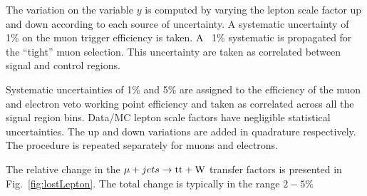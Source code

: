 The variation on the variable $y$ is computed by varying the lepton scale factor
up and down according to each source of uncertainty. 
A systematic uncertainty of 1\% on the muon trigger efficiency is taken. 
A ~1\% systematic is propagated for the ``tight'' muon selection. 
This uncertainty are taken as correlated between signal and control regions. 

Systematic uncertainties of 1\% and 5\% are assigned to the efficiency of the muon and electron veto working point efficiency and taken as correlated across all the signal region bins. 
Data/MC lepton scale factors have negligible statistical uncertainties. 
The up and down variations are added in quadrature respectively. 
The procedure is repeated separately for muons and
electrons. 

The relative change in the $\mu + jets \rightarrow \mathrm{tt+W}$ transfer factors 
is presented in Fig.~\ref{fig:lostLepton}. The
total change is typically in the range $2-5\%$

